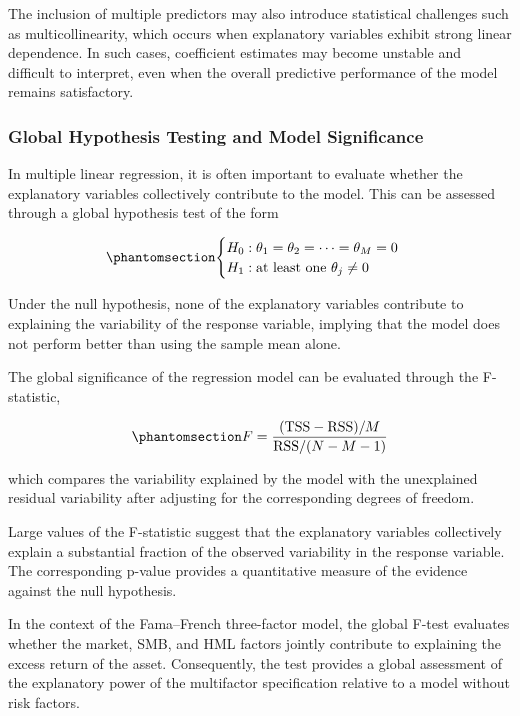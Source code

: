 \documentclass[
  12pt,
  letterpaper,
]{book}
\begin{document}
The inclusion of multiple predictors may also introduce statistical
challenges such as multicollinearity, which occurs when explanatory
variables exhibit strong linear dependence. In such cases, coefficient
estimates may become unstable and difficult to interpret, even when the
overall predictive performance of the model remains satisfactory.

\subsubsection{Global Hypothesis Testing and Model
Significance}\label{global-hypothesis-testing-and-model-significance}

In multiple linear regression, it is often important to evaluate whether
the explanatory variables collectively contribute to the model. This can
be assessed through a global hypothesis test of the form

\begin{equation}\phantomsection\label{eq-global-hypothesis}{
\begin{cases}
H_0 :
\theta_1 = \theta_2 = \cdots = \theta_M = 0 \\
H_1 :
\text{at least one } \theta_j \neq 0
\end{cases}
}\end{equation}

Under the null hypothesis, none of the explanatory variables contribute
to explaining the variability of the response variable, implying that
the model does not perform better than using the sample mean alone.

The global significance of the regression model can be evaluated through
the F-statistic,

\begin{equation}\phantomsection\label{eq-global-f-statistic}{
F
=
\frac{
(\mathrm{TSS} - \mathrm{RSS})/M
}{
\mathrm{RSS}/(N - M - 1)
}
}\end{equation}

which compares the variability explained by the model with the
unexplained residual variability after adjusting for the corresponding
degrees of freedom.

Large values of the F-statistic suggest that the explanatory variables
collectively explain a substantial fraction of the observed variability
in the response variable. The corresponding p-value provides a
quantitative measure of the evidence against the null hypothesis.

In the context of the Fama--French three-factor model, the global F-test
evaluates whether the market, SMB, and HML factors jointly contribute to
explaining the excess return of the asset. Consequently, the test
provides a global assessment of the explanatory power of the multifactor
specification relative to a model without risk factors.
\end{document}

